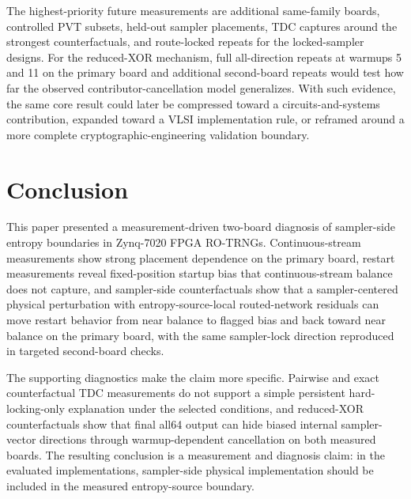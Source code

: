 \documentclass[journal]{IEEEtran}
\newcommand{\rotrng}{RO-TRNG}
\newcommand{\tdc}{TDC}
\begin{document}
The highest-priority future measurements are additional same-family boards, controlled PVT subsets, held-out sampler placements, \tdc{} captures around the strongest counterfactuals, and route-locked repeats for the locked-sampler designs. For the reduced-XOR mechanism, full all-direction repeats at warmups 5 and 11 on the primary board and additional second-board repeats would test how far the observed contributor-cancellation model generalizes. With such evidence, the same core result could later be compressed toward a circuits-and-systems contribution, expanded toward a VLSI implementation rule, or reframed around a more complete cryptographic-engineering validation boundary.

\section{Conclusion}

This paper presented a measurement-driven two-board diagnosis of sampler-side entropy boundaries in Zynq-7020 FPGA \rotrng{}s. Continuous-stream measurements show strong placement dependence on the primary board, restart measurements reveal fixed-position startup bias that continuous-stream balance does not capture, and sampler-side counterfactuals show that a sampler-centered physical perturbation with entropy-source-local routed-network residuals can move restart behavior from near balance to flagged bias and back toward near balance on the primary board, with the same sampler-lock direction reproduced in targeted second-board checks.

The supporting diagnostics make the claim more specific. Pairwise and exact counterfactual \tdc{} measurements do not support a simple persistent hard-locking-only explanation under the selected conditions, and reduced-XOR counterfactuals show that final all64 output can hide biased internal sampler-vector directions through warmup-dependent cancellation on both measured boards. The resulting conclusion is a measurement and diagnosis claim: in the evaluated implementations, sampler-side physical implementation should be included in the measured entropy-source boundary.



\end{document}
